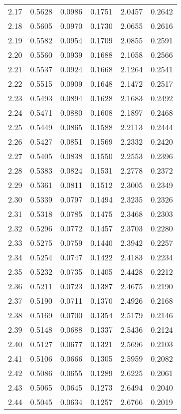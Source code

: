 \documentclass{article}
\begin{document}
\begin{longtable}{cccccc}
2.17 & 0.5628 & 0.0986 & 0.1751 & 2.0457 & 0.2642 \\
2.18 & 0.5605 & 0.0970 & 0.1730 & 2.0655 & 0.2616 \\
2.19 & 0.5582 & 0.0954 & 0.1709 & 2.0855 & 0.2591 \\
2.20 & 0.5560 & 0.0939 & 0.1688 & 2.1058 & 0.2566 \\
2.21 & 0.5537 & 0.0924 & 0.1668 & 2.1264 & 0.2541 \\
2.22 & 0.5515 & 0.0909 & 0.1648 & 2.1472 & 0.2517 \\
2.23 & 0.5493 & 0.0894 & 0.1628 & 2.1683 & 0.2492 \\
2.24 & 0.5471 & 0.0880 & 0.1608 & 2.1897 & 0.2468 \\
2.25 & 0.5449 & 0.0865 & 0.1588 & 2.2113 & 0.2444 \\
2.26 & 0.5427 & 0.0851 & 0.1569 & 2.2332 & 0.2420 \\
2.27 & 0.5405 & 0.0838 & 0.1550 & 2.2553 & 0.2396 \\
2.28 & 0.5383 & 0.0824 & 0.1531 & 2.2778 & 0.2372 \\
2.29 & 0.5361 & 0.0811 & 0.1512 & 2.3005 & 0.2349 \\
2.30 & 0.5339 & 0.0797 & 0.1494 & 2.3235 & 0.2326 \\
2.31 & 0.5318 & 0.0785 & 0.1475 & 2.3468 & 0.2303 \\
2.32 & 0.5296 & 0.0772 & 0.1457 & 2.3703 & 0.2280 \\
2.33 & 0.5275 & 0.0759 & 0.1440 & 2.3942 & 0.2257 \\
2.34 & 0.5254 & 0.0747 & 0.1422 & 2.4183 & 0.2234 \\
2.35 & 0.5232 & 0.0735 & 0.1405 & 2.4428 & 0.2212 \\
2.36 & 0.5211 & 0.0723 & 0.1387 & 2.4675 & 0.2190 \\
2.37 & 0.5190 & 0.0711 & 0.1370 & 2.4926 & 0.2168 \\
2.38 & 0.5169 & 0.0700 & 0.1354 & 2.5179 & 0.2146 \\
2.39 & 0.5148 & 0.0688 & 0.1337 & 2.5436 & 0.2124 \\
2.40 & 0.5127 & 0.0677 & 0.1321 & 2.5696 & 0.2103 \\
2.41 & 0.5106 & 0.0666 & 0.1305 & 2.5959 & 0.2082 \\
2.42 & 0.5086 & 0.0655 & 0.1289 & 2.6225 & 0.2061 \\
2.43 & 0.5065 & 0.0645 & 0.1273 & 2.6494 & 0.2040 \\
2.44 & 0.5045 & 0.0634 & 0.1257 & 2.6766 & 0.2019 \\

\end{longtable}
\end{document}
